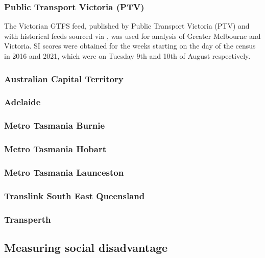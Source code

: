 \documentclass[preprint, 3p,
authoryear]{elsarticle} %
\begin{document}
\subsubsection{Public Transport Victoria
(PTV)}\label{public-transport-victoria-ptv}

The Victorian GTFS feed, published by Public Transport Victoria (PTV)
and with historical feeds sourced via
\citet{transitfeeds_victoria:2023aa}, was used for analysis of Greater
Melbourne and Victoria. SI scores were obtained for the weeks starting
on the day of the census in 2016 and 2021, which were on Tuesday 9th and
10th of August respectively.

\subsubsection{Australian Capital
Territory}\label{australian-capital-territory}

\subsubsection{Adelaide}\label{adelaide}

\subsubsection{Metro Tasmania Burnie}\label{metro-tasmania-burnie}

\subsubsection{Metro Tasmania Hobart}\label{metro-tasmania-hobart}

\subsubsection{Metro Tasmania
Launceston}\label{metro-tasmania-launceston}

\subsubsection{Translink South East
Queensland}\label{translink-south-east-queensland}

\subsubsection{Transperth}\label{transperth}

\subsection{Measuring social
disadvantage}\label{measuring-social-disadvantage}
\end{document}
